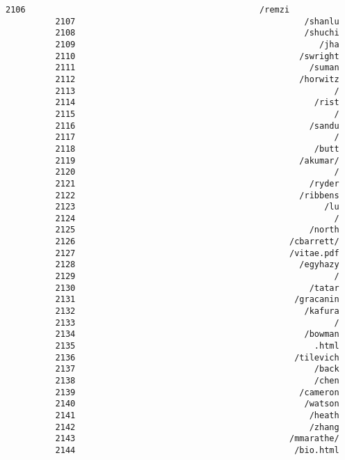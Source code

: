 \documentclass[11pt]{article}
\begin{document}
\begin{Verbatim}[commandchars=\\\{\}]
          2106                                               /remzi
          2107                                              /shanlu
          2108                                              /shuchi
          2109                                                 /jha
          2110                                             /swright
          2111                                               /suman
          2112                                             /horwitz
          2113                                                    /
          2114                                                /rist
          2115                                                    /
          2116                                               /sandu
          2117                                                    /
          2118                                                /butt
          2119                                             /akumar/
          2120                                                    /
          2121                                               /ryder
          2122                                             /ribbens
          2123                                                  /lu
          2124                                                    /
          2125                                               /north
          2126                                           /cbarrett/
          2127                                           /vitae.pdf
          2128                                             /egyhazy
          2129                                                    /
          2130                                               /tatar
          2131                                            /gracanin
          2132                                              /kafura
          2133                                                    /
          2134                                              /bowman
          2135                                                .html
          2136                                            /tilevich
          2137                                                /back
          2138                                                /chen
          2139                                             /cameron
          2140                                              /watson
          2141                                               /heath
          2142                                               /zhang
          2143                                           /mmarathe/
          2144                                            /bio.html

\end{Verbatim}
\end{document}
